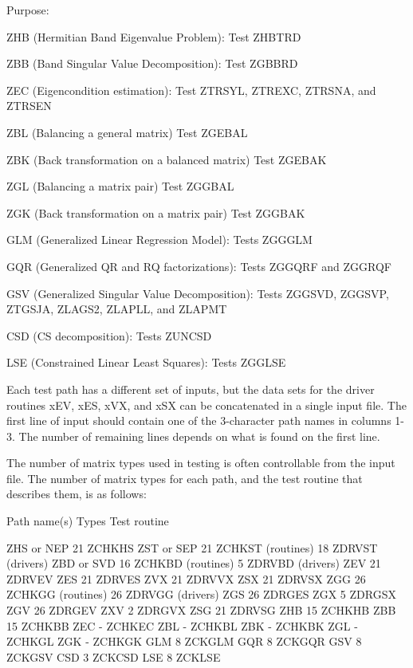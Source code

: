\begin{DoxyParagraph}{Purpose\+: }
\begin{DoxyVerb}
 ZHB (Hermitian Band Eigenvalue Problem):
     Test ZHBTRD

 ZBB (Band Singular Value Decomposition):
     Test ZGBBRD

 ZEC (Eigencondition estimation):
     Test ZTRSYL, ZTREXC, ZTRSNA, and ZTRSEN

 ZBL (Balancing a general matrix)
     Test ZGEBAL

 ZBK (Back transformation on a balanced matrix)
     Test ZGEBAK

 ZGL (Balancing a matrix pair)
     Test ZGGBAL

 ZGK (Back transformation on a matrix pair)
     Test ZGGBAK

 GLM (Generalized Linear Regression Model):
     Tests ZGGGLM

 GQR (Generalized QR and RQ factorizations):
     Tests ZGGQRF and ZGGRQF

 GSV (Generalized Singular Value Decomposition):
     Tests ZGGSVD, ZGGSVP, ZTGSJA, ZLAGS2, ZLAPLL, and ZLAPMT

 CSD (CS decomposition):
     Tests ZUNCSD

 LSE (Constrained Linear Least Squares):
     Tests ZGGLSE

 Each test path has a different set of inputs, but the data sets for
 the driver routines xEV, xES, xVX, and xSX can be concatenated in a
 single input file.  The first line of input should contain one of the
 3-character path names in columns 1-3.  The number of remaining lines
 depends on what is found on the first line.

 The number of matrix types used in testing is often controllable from
 the input file.  The number of matrix types for each path, and the
 test routine that describes them, is as follows:

 Path name(s)  Types    Test routine

 ZHS or NEP      21     ZCHKHS
 ZST or SEP      21     ZCHKST (routines)
                 18     ZDRVST (drivers)
 ZBD or SVD      16     ZCHKBD (routines)
                  5     ZDRVBD (drivers)
 ZEV             21     ZDRVEV
 ZES             21     ZDRVES
 ZVX             21     ZDRVVX
 ZSX             21     ZDRVSX
 ZGG             26     ZCHKGG (routines)
                 26     ZDRVGG (drivers)
 ZGS             26     ZDRGES
 ZGX              5     ZDRGSX
 ZGV             26     ZDRGEV
 ZXV              2     ZDRGVX
 ZSG             21     ZDRVSG
 ZHB             15     ZCHKHB
 ZBB             15     ZCHKBB
 ZEC              -     ZCHKEC
 ZBL              -     ZCHKBL
 ZBK              -     ZCHKBK
 ZGL              -     ZCHKGL
 ZGK              -     ZCHKGK
 GLM              8     ZCKGLM
 GQR              8     ZCKGQR
 GSV              8     ZCKGSV
 CSD              3     ZCKCSD
 LSE              8     ZCKLSE


\end{DoxyVerb}
\end{DoxyParagraph}

